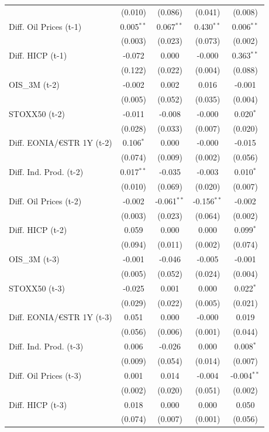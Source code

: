 \begin{longtable}[t]{lcccc}
 & (0.010) & (0.086) & (0.041) & (0.008)\\
Diff. Oil Prices (t-1) & 0.005$^{**}$ & 0.067$^{**}$ & 0.430$^{**}$ & 0.006$^{**}$\\
 & (0.003) & (0.023) & (0.073) & (0.002)\\
Diff. HICP (t-1) & -0.072 & 0.000 & -0.000 & 0.363$^{**}$\\
 & (0.122) & (0.022) & (0.004) & (0.088)\\
OIS\_3M (t-2) & -0.002 & 0.002 & 0.016 & -0.001\\
 & (0.005) & (0.052) & (0.035) & (0.004)\\
STOXX50 (t-2) & -0.011 & -0.008 & -0.000 & 0.020$^{*}$\\
 & (0.028) & (0.033) & (0.007) & (0.020)\\
Diff. EONIA/€STR 1Y (t-2) & 0.106$^{*}$ & 0.000 & -0.000 & -0.015\\
 & (0.074) & (0.009) & (0.002) & (0.056)\\
Diff. Ind. Prod. (t-2) & 0.017$^{**}$ & -0.035 & -0.003 & 0.010$^{*}$\\
 & (0.010) & (0.069) & (0.020) & (0.007)\\
Diff. Oil Prices (t-2) & -0.002 & -0.061$^{**}$ & -0.156$^{**}$ & -0.002\\
 & (0.003) & (0.023) & (0.064) & (0.002)\\
Diff. HICP (t-2) & 0.059 & 0.000 & 0.000 & 0.099$^{*}$\\
 & (0.094) & (0.011) & (0.002) & (0.074)\\
OIS\_3M (t-3) & -0.001 & -0.046 & -0.005 & -0.001\\
 & (0.005) & (0.052) & (0.024) & (0.004)\\
STOXX50 (t-3) & -0.025 & 0.001 & 0.000 & 0.022$^{*}$\\
 & (0.029) & (0.022) & (0.005) & (0.021)\\
Diff. EONIA/€STR 1Y (t-3) & 0.051 & 0.000 & -0.000 & 0.019\\
 & (0.056) & (0.006) & (0.001) & (0.044)\\
Diff. Ind. Prod. (t-3) & 0.006 & -0.026 & 0.000 & 0.008$^{*}$\\
 & (0.009) & (0.054) & (0.014) & (0.007)\\
Diff. Oil Prices (t-3) & 0.001 & 0.014 & -0.004 & -0.004$^{**}$\\
 & (0.002) & (0.020) & (0.051) & (0.002)\\
Diff. HICP (t-3) & 0.018 & 0.000 & 0.000 & 0.050\\
 & (0.074) & (0.007) & (0.001) & (0.056)\\

\end{longtable}
